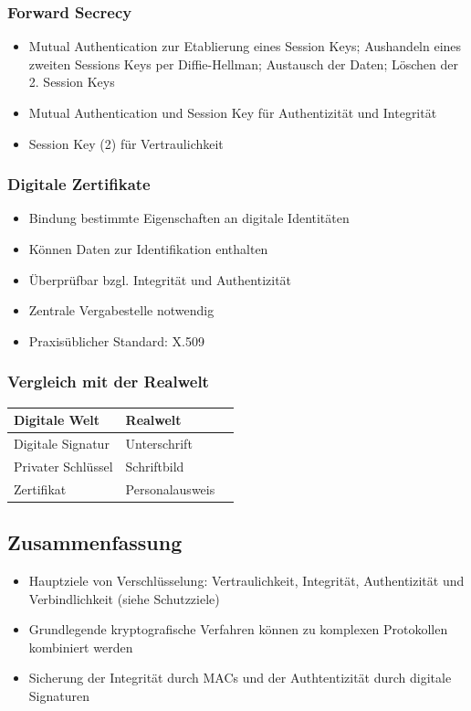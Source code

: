 \subsubsection{Forward Secrecy}
\begin{itemize}
	\item Mutual Authentication zur Etablierung eines Session Keys; Aushandeln eines zweiten Sessions Keys per Diffie-Hellman; Austausch der Daten; Löschen der 2. Session Keys
	\item Mutual Authentication und Session Key für Authentizität und Integrität
	\item Session Key (2) für Vertraulichkeit
\end{itemize}

\subsubsection{Digitale Zertifikate}
\begin{itemize}
	\item Bindung bestimmte Eigenschaften an digitale Identitäten
	\item Können Daten zur Identifikation enthalten
	\item Überprüfbar bzgl. Integrität und Authentizität
	\item Zentrale Vergabestelle notwendig
	\item Praxisüblicher Standard: X.509
\end{itemize}

\subsubsection{Vergleich mit der Realwelt}

\begin{tabularx}{\columnwidth}{|X|X|l}
	\hline
	\textbf{Digitale Welt} & \textbf{Realwelt} \\
	\hline
	Digitale Signatur & Unterschrift \\
	Privater Schlüssel & Schriftbild \\
	Zertifikat & Personalausweis \\
	\hline
\end{tabularx}


\subsection{Zusammenfassung}
\begin{itemize}
	\item Hauptziele von Verschlüsselung: Vertraulichkeit, Integrität, Authentizität und Verbindlichkeit (siehe Schutzziele)
	\item Grundlegende kryptografische Verfahren können zu komplexen Protokollen kombiniert werden
	\item Sicherung der Integrität durch MACs und der Authtentizität durch digitale Signaturen
\end{itemize}



